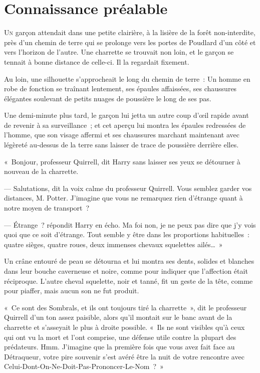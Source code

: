 \chapter{Connaissance préalable}

\lettrine{U}{n} garçon attendait dans une petite clairière, à la lisière de la forêt non-interdite, près d'un chemin de terre qui se prolonge vers les portes de Poudlard d'un côté et vers l'horizon de l'autre. Une charrette se trouvait non loin, et le garçon se tennait à bonne distance de celle-ci. Il la regardait fixement.

Au loin, une silhouette s'approcheait le long du chemin de terre~: Un homme en robe de fonction se traînant lentement, ses épaules affaissées, ses chaussures élégantes soulevant de petits nuages de poussière le long de ses pas.

Une demi-minute plus tard, le garçon lui jetta un autre coup d'œil rapide avant de revenir à sa surveillance~; et cet aperçu lui montra les épaules redressées de l'homme, que son visage affermi et ses chaussures marchant maintenant avec légèreté au-dessus de la terre sans laisser de trace de poussière derrière elles.

«~Bonjour, professeur Quirrell, dit Harry sans laisser ses yeux se détourner à nouveau de la charrette.

--- Salutations, dit la voix calme du professeur Quirrell. Vous semblez garder vos distances, M. Potter. J'imagine que vous ne remarquez rien d'étrange quant à notre moyen de transport~?

--- Étrange~? répondit Harry en écho. Ma foi non, je ne peux pas dire que j'y vois quoi que ce soit d'étrange. Tout semble y être dans les proportions habituelles~: quatre sièges, quatre roues, deux immenses chevaux squelettes ailés…~»

Un crâne entouré de peau se détourna et lui montra ses dents, solides et blanches dans leur bouche caverneuse et noire, comme pour indiquer que l'affection était réciproque. L'autre cheval squelette, noir et tanné, fit un geste de la tête, comme pour piaffer, mais aucun son ne fut produit.

«~Ce sont des Sombrals, et ils ont toujours tiré la charrette~», dit le professeur Quirrell d'un ton assez paisible, alors qu'il montait sur le banc avant de la charrette et s'asseyait le plus à droite possible. «~Ils ne sont visibles qu'à ceux qui ont vu la mort et l'ont comprise, une défense utile contre la plupart des prédateurs. Hmm. J'imagine que la première fois que vous avez fait face au Détraqueur, votre pire souvenir s'est avéré être la nuit de votre rencontre avec Celui-Dont-On-Ne-Doit-Pas-Prononcer-Le-Nom~?~»

